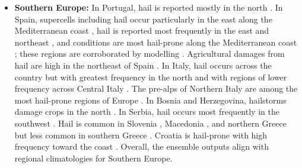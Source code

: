 \documentclass[pdflatex, sn-nature]{sn-jnl}\usepackage[]{graphicx}\usepackage[]{xcolor}
\begin{document}
\begin{itemize}
    \item \textbf{Southern Europe:} In Portugal, hail is reported mostly in the
    north \citep{Santos_IJC_2019}. In Spain, supercells including hail occur
    particularly in the east along the Mediterranean coast
    \citep{Calvo-Sancho_WCD_2022}, hail is reported most frequently in the east
    and northeast \citep{Saa-Requejo_NHESS_2011}, and conditions are most
    hail-prone along the Mediterranean coast \citep{Mohr_AR_2013}; these regions
    are corroborated by modelling \citep{Cui_JGRA_2025}. Agricultural damages
    from hail are high in the northeast of Spain \citep[][and references
    therein]{Punge_AR_2016}. In Italy, hail occurs across the country but with
    greatest frequency in the north and with regions of lower frequency across
    Central Italy \citep{Baldi_AR_2014, Cui_JGRA_2025}. The pre-alps of Northern
    Italy are among the most hail-prone regions of Europe \citep{Mohr_AR_2013,
    Cui_JGRA_2025, Punge_AR_2016}. In Bosnia and Herzegovina, hailstorms damage
    crops in the north \citep{Dejanovic_2019}. In Serbia, hail occurs most
    frequently in the southwest \citep{Curic_IJC_2016}. Hail is common in
    Slovenia \citep{Punge_AR_2016}, Macedonia \citep{Dimitrievski_JWM_1983}, and
    northern Greece \citep{Sioutas_AR_2009} but less common in southern Greece
    \citep{Punge_AR_2016}. Croatia is hail-prone with high frequency toward the
    coast \citep{Blaskovic_AR_2023, Jelic_JGRA_2020, Mohr_GRL_2015}. Overall,
    the ensemble outputs align with regional climatologies for Southern Europe.


\end{itemize}
\end{document}
